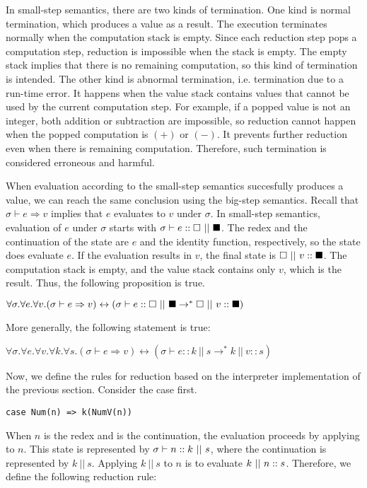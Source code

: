 In small-step
semantics, there are two kinds of termination. One kind is normal
termination, which produces a value as a result. The execution terminates
normally when the computation stack is empty. Since each reduction step pops a
computation step, reduction is impossible when the stack is empty. The empty
stack implies that there is no remaining computation, so this kind of
termination is intended. The other kind is abnormal termination, i.e.
termination due to a run-time error. It happens when the value stack contains
values that cannot be used by the current computation step. For example,
if a popped value is not an integer, both addition or subtraction are
impossible, so reduction cannot happen when the popped computation is $(+)$ or
$(-)$. It prevents further reduction even when
there is remaining computation. Therefore, such termination is considered
erroneous and harmful.

When evaluation according to the small-step semantics succesfully produces a
value, we can reach the same conclusion using the big-step semantics.
Recall that $\sigma\vdash e\Rightarrow v$ implies that $e$ evaluates to $v$
under $\sigma$. In small-step semantics, evaluation of $e$ under $\sigma$ starts
with $\evalk{\sigma}{e}\mtk\ ||\ \mts$. The redex and the continuation of the
state are $e$ and the identity function, respectively, so the state does evaluate
$e$. If the evaluation results in $v$, the final state is
$\mtk\ ||\ \conss{v}\mts$. The computation stack is empty, and the value stack
contains only $v$, which is the result. Thus, the following proposition is true.

$\forall \sigma.\forall e.\forall v.(\sigma\vdash e\Rightarrow
v)\leftrightarrow(\sigma\vdash e:: \square\ ||\
\blacksquare\rightarrow^\ast\square\ ||\ v::\blacksquare)$

More generally, the following statement is true:

$\forall \sigma.\forall e.\forall v.\forall k.\forall s.(\sigma\vdash
e\Rightarrow v)\leftrightarrow(\sigma\vdash e::k\ ||\
s\rightarrow^\ast k\ ||\ v::s)$

Now, we define the rules for reduction based on the interpreter implementation
of the previous section. Consider the  case first.

\begin{verbatim}
case Num(n) => k(NumV(n))
\end{verbatim}

When $n$ is the redex and  is the continuation, the evaluation proceeds
by applying  to $n$. This state is represented by $\sigma\vdash n::k\
||\ s$, where the continuation  is represented by $k\ ||\ s$.
Applying $k\ ||\ s$ to $n$ is to evaluate $k\ ||\ n::s$. Therefore, we
define the following reduction rule:

